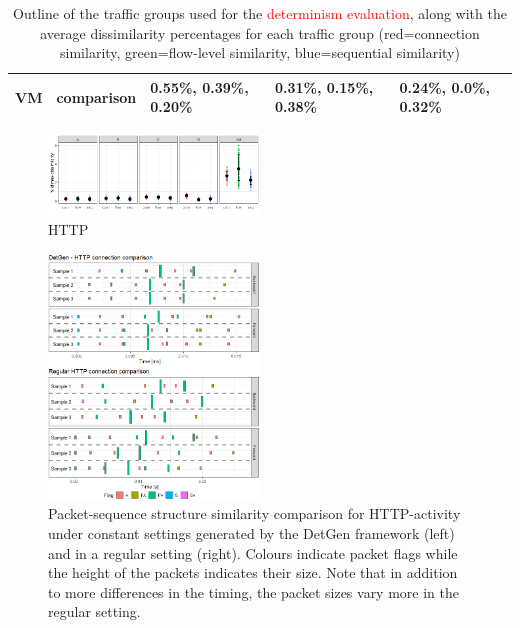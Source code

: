 \documentclass[sigconf]{acmart}
\begin{document}
\begin{table}
\begin{tabular}{p{0.8cm}|p{2.5cm}|p{2.7cm}|p{2.7cm}|p{2.7cm}}
VM & comparison&\footnotesize \textcolor{myred}{0.55\%}, \textcolor{mygreen}{0.39\%}, \textcolor{myblue}{0.20\%}&
 \footnotesize \textcolor{myred}{0.31\%}, \textcolor{mygreen}{0.15\%}, \textcolor{myblue}{0.38\%}&
 \footnotesize \textcolor{myred}{0.24\%}, \textcolor{mygreen}{0.0\%}, \textcolor{myblue}{0.32\%}\\ \hline \hline
\end{tabular}
\caption{Outline of the traffic groups used for the \textcolor{red}{determinism evaluation}, along with the average dissimilarity percentages for each traffic group (red=connection similarity, green=flow-level similarity, blue=sequential similarity)}\label{Dataset}
\end{table}

\begin{figure}
\centering
\includegraphics[width=0.5\textwidth]{images/Exp1.png}
\caption{HTTP}\label{determ-metric}
\end{figure}



\begin{figure}
\centering
\includegraphics[width=0.5\textwidth]{images/HTTP_comp_crop.png}
\caption{Packet-sequence structure similarity comparison for HTTP-activity under constant settings generated by the DetGen framework (left) and in a regular setting (right). Colours indicate packet flags while the height of the packets indicates their size. Note that in addition to more differences in the timing, the packet sizes vary more in the regular setting. }
\end{figure}
\end{document}
